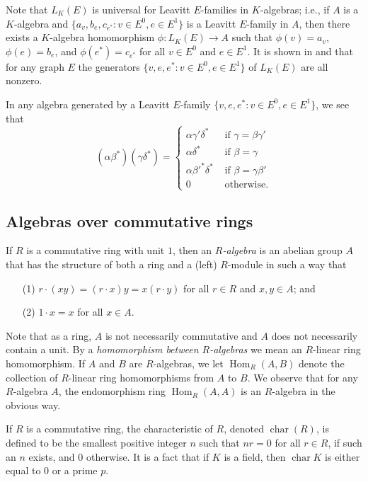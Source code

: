 \documentclass[11pt]{amsart}
\theoremstyle{remark}
\numberwithin{equation}{section}
\newcommand{\ch}{\operatorname{char}}
\begin{document}
Note that $L_K(E)$ is universal for Leavitt $E$-families in $K$-algebras; i.e., if $A$ is a $K$-algebra and $\{ a_v, b_e, c_{e^*}: v \in E^0, e \in E^1 \}$ is a Leavitt $E$-family in $A$, then there exists a $K$-algebra homomorphism $\phi : L_K(E) \to A$ such that $\phi(v) = a_v$, $\phi(e)=b_e$, and $\phi(e^*)=c_{e^*}$ for all $v \in E^0$ and $e \in E^1$.  It is shown in \cite[\S 1]{AbrPino} and \cite[\S 1]{AbrPino3} that for any graph $E$ the generators $\{ v, e, e^* : v \in E^0, e \in E^1 \}$ of $L_K(E)$ are all nonzero.

In any algebra generated by a Leavitt $E$-family $\{ v, e, e^* : v \in E^0, e \in E^1 \}$, we see that 
\begin{equation} \label{mult-rules-eq}
(\alpha \beta^*)( \gamma \delta^*) = \begin{cases} \alpha \gamma' \delta^* & \text{ if $\gamma = \beta \gamma'$} \\ \alpha \delta^* & \text{ if $\beta = \gamma$} \\ \alpha \beta'^* \delta^* & \text{ if $\beta = \gamma \beta'$} \\ 0 & \text{ otherwise.} \end{cases}
\end{equation}



\subsection{Algebras over commutative rings}  If $R$ is a commutative ring with unit $1$, then an \emph{$R$-algebra} is an abelian group $A$ that has the structure of both a ring and a (left) $R$-module in such a way that 
\begin{itemize}
\item[(1)] $r \cdot (xy) = (r \cdot x) y = x (r \cdot y)$ for all $r \in R$ and $x,y \in A$; and
\item[(2)] $1\cdot x = x$ for all $x \in A$.
\end{itemize}
Note that as a ring, $A$ is not necessarily commutative and $A$ does not necessarily contain a unit.  By a  \emph{homomorphism between $R$-algebras} we mean an $R$-linear ring homomorphism.  If $A$ and $B$ are $R$-algebras, we let $\operatorname{Hom}_R (A,B)$ denote the collection of $R$-linear ring homomorphisms from $A$ to $B$.  We observe that for any $R$-algebra $A$, the endomorphism ring $\operatorname{Hom}_R (A,A)$ is an $R$-algebra in the obvious way.


If $R$ is a commutative ring, the characteristic of $R$, denoted $\ch (R)$, is defined to be the smallest positive integer $n$ such that $n r = 0$ for all $r \in R$, if such an $n$ exists, and $0$ otherwise. It is a fact that if $K$ is a field, then $\ch K$ is either equal to $0$ or a prime $p$.
\end{document}
